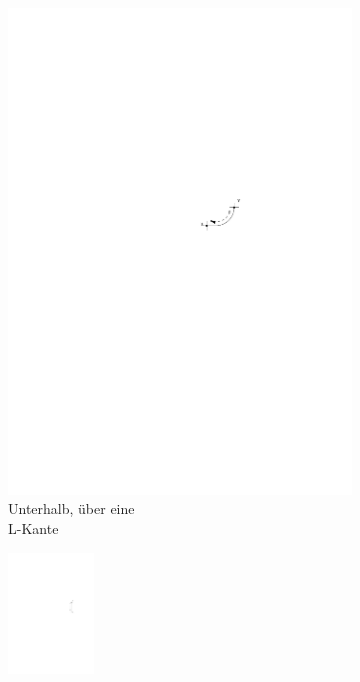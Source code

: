 \documentclass[a4paper]{scrreprt}
\theoremstyle{definition}
\begin{document}
\begin{figure}[h]
\begin{subfigure}[b]{0.2\textwidth}
                \includegraphics[width=\textwidth]{schnitt_finden_bot_aboveL}
                \caption{Unterhalb, über eine \\ L-Kante}
                \label{fig:cutfinding_bot_aboveL}
        \end{subfigure}
        \quad
        \begin{subfigure}[b]{0.2\textwidth}
                \includegraphics[width=0.25\textwidth]{schnitt_finden_bot_vertical}

\end{subfigure}
\end{figure}
\end{document}
